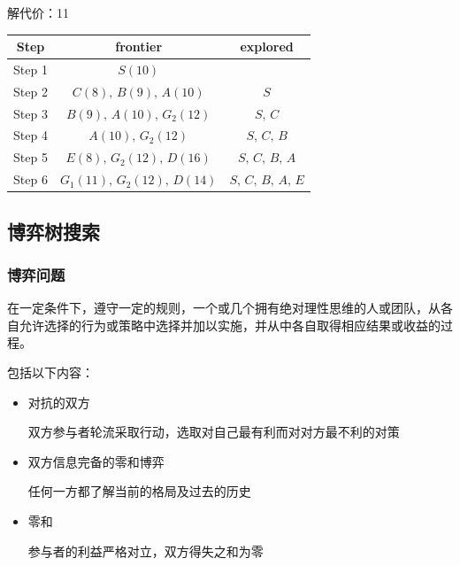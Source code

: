\begin{example}
\begin{enumerate}
        \textcolor{main1}{解代价：}11
        \begin{table}[htbp]
            \centering
            \begin{tabular}{ccc}
            \toprule
            Step & frontier & explored \\
            \midrule
            Step 1 & $S(10)$ &  \\
            Step 2 & $C(8),\,B(9),\,A(10)$ & $S$ \\
            Step 3 & $B(9),\,A(10),\,G_2(12)$ & $S,\,C$ \\
            Step 4 & $A(10),\,G_2(12)$ & $S,\,C,\,B$ \\
            Step 5 & $E(8),\,G_2(12),\,D(16)$ & $S,\,C,\,B,\,A$ \\
            Step 6 & $G_1(11),\,G_2(12),\,D(14)$ & $S,\,C,\,B,\,A,\,E$ \\
            \bottomrule
            \end{tabular}%
        \end{table}%
    
    \end{enumerate}
\end{example}
\subsection{博弈树搜索}
\subsubsection{博弈问题}
\begin{definition}[博弈]
    在一定条件下，遵守一定的\textcolor{main1}{规则}，\textcolor{main1}{一个或几个}拥有绝对理性思维的人或团队，从各自允许选择的行为或策略中选择并加以实施，并从中各自取得相应\textcolor{main1}{结果或收益}的过程。
\end{definition}
\begin{definition}[双方信息完备的零和博弈]
    包括以下内容：\newline
    \begin{itemize}
        \item 对抗的双方
        
        双方参与者轮流采取行动，选取对自己最有利而对对方最不利的对策
        \item 双方信息完备的零和博弈
        
        任何一方都了解当前的格局及过去的历史
        \item 零和
        
        参与者的利益严格对立，双方得失之和为零
    \end{itemize} 
\end{definition}

